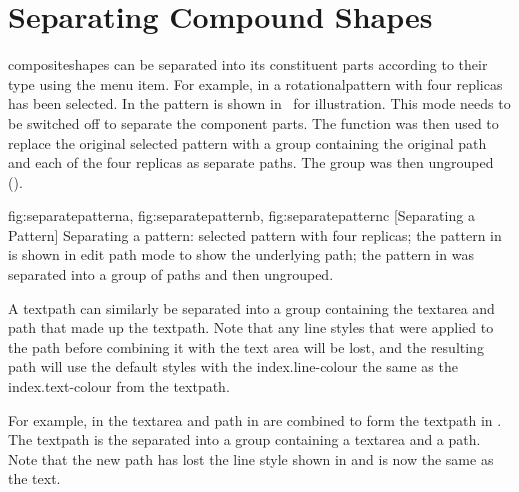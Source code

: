 
\section{Separating Compound Shapes}\label{sec:separate}


\Glspl{compositeshape} can be separated into its constituent parts
according to their type using the  menu
item.  For example, in  a
\gls{rotationalpattern} with four replicas has been selected. In
 the pattern is shown in
\editpathmode\ for illustration. This mode needs to be switched off
to separate the component parts. The  function
was then used to replace the original selected \gls{pattern} with a
group containing the original path and each of the four replicas as
separate \glspl{path}. The group was then ungrouped
().

{
  {fig:separatepatterna}{}{},
  {fig:separatepatternb}{}{},
  {fig:separatepatternc}{}{}
}
[Separating a Pattern]
{Separating a pattern:
 selected pattern with four
replicas;
 the pattern in 
is shown in edit path mode to show the underlying path;
 the pattern in 
was separated into a group of paths and then ungrouped.}

A \gls{textpath} can similarly be separated into a group containing the
\gls{textarea} and \gls{path} that made up the \gls*{textpath}.
Note that any line styles that were applied to the path before
combining it with the text area will be lost, and the resulting
path will use the default styles with the \gls{index.line-colour} the same
as the \gls{index.text-colour} from the \gls*{textpath}.

For example, in  the \gls*{textarea} and
\gls*{path} in  are combined to
form the \gls*{textpath} in . The
\gls*{textpath} is the separated into a group containing a
\gls*{textarea} and a \gls*{path}. Note that the new path has
lost the line style shown in 
and is now the same  as the text.

